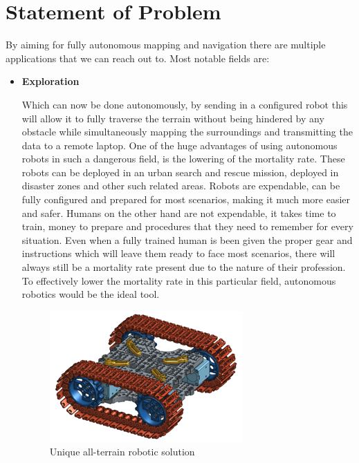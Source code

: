 \documentclass[12pt]{report}
\begin{document}
\chapter{Statement of Problem}
By aiming for fully autonomous mapping and navigation there are multiple applications that we can reach out to. Most notable fields are:\par
\begin{itemize}
    \item \textbf{Exploration}\par
    Which can now be done autonomously, by sending in a configured robot this will allow it to fully traverse the terrain without being hindered by any obstacle while simultaneously mapping the surroundings and transmitting the data to a remote laptop. One of the huge advantages of using autonomous robots in such a dangerous field, is the lowering of the mortality rate. These robots can be deployed in an urban search and rescue mission, deployed in disaster zones and other such related areas. Robots are expendable, can be fully configured and prepared for most scenarios, making it much more easier and safer. Humans on the other hand are not expendable, it takes time to train, money to prepare and procedures that they need to remember for every situation. Even when a fully trained human is been given the proper gear and instructions which will leave them ready to face most scenarios, there will always still be a mortality rate present due to the nature of their profession. To effectively lower the mortality rate in this particular field, autonomous robotics would be the ideal tool.\par
    \begin{figure}[H]
        \centering
        \includegraphics{Fig1.png}
        \caption{Unique all-terrain robotic solution}
        \label{fig:1}
    \end{figure}



\end{itemize}
\end{document}
